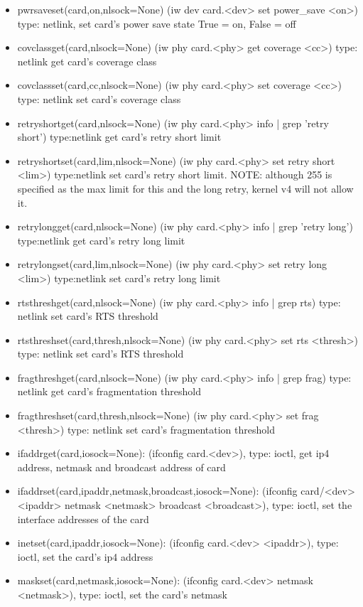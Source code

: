 \documentclass[11pt]{article}
\begin{document}
\begin{appendices}
\begin{itemize}
\item pwrsaveset(card,on,nlsock=None) (iw dev card.<dev> set power\_save <on>) type:
netlink, set card's power save state True = on, False = off
\item covclassget(card,nlsock=None) (iw phy card.<phy> get coverage <cc>) type:
netlink get card's coverage class
\item covclassset(card,cc,nlsock=None) (iw phy card.<phy> set coverage <cc>) type:
netlink set card's coverage class
\item retryshortget(card,nlsock=None) (iw phy card.<phy> info | grep 'retry short')
type:netlink get card's retry short limit
\item retryshortset(card,lim,nlsock=None) (iw phy card.<phy> set retry short <lim>)
type:netlink set card's retry short limit. NOTE: although 255 is specified as the
max limit for this and the long retry, kernel v4 will not allow it.
\item retrylongget(card,nlsock=None) (iw phy card.<phy> info | grep 'retry long')
type:netlink get card's retry long limit
\item retrylongset(card,lim,nlsock=None) (iw phy card.<phy> set retry long <lim>)
type:netlink set card's retry long limit
\item rtsthreshget(card,nlsock=None) (iw phy card.<phy> info | grep rts) type: 
netlink set card's RTS threshold
\item rtsthreshset(card,thresh,nlsock=None) (iw phy card.<phy> set rts <thresh>) type: 
netlink set card's RTS threshold
\item fragthreshget(card,nlsock=None) (iw phy card.<phy> info | grep frag) type: 
netlink get card's fragmentation threshold
\item fragthreshset(card,thresh,nlsock=None) (iw phy card.<phy> set frag <thresh>) type: 
netlink set card's fragmentation threshold
\item ifaddrget(card,iosock=None): (ifconfig card.<dev>), type: ioctl, get ip4 address,
netmask and broadcast address of card
\item ifaddrset(card,ipaddr,netmask,broadcast,iosock=None): (ifconfig card/<dev> 
<ipaddr> netmask <netmask> broadcast <broadcast>), type: ioctl, set the interface 
addresses of the card
\item inetset(card,ipaddr,iosock=None): (ifconfig card.<dev> <ipaddr>), type: ioctl,
set the card's ip4 address
\item maskset(card,netmask,iosock=None): (ifconfig card.<dev> netmask <netmask>), 
type: ioctl, set the card's netmask

\end{itemize}
\end{appendices}
\end{document}
